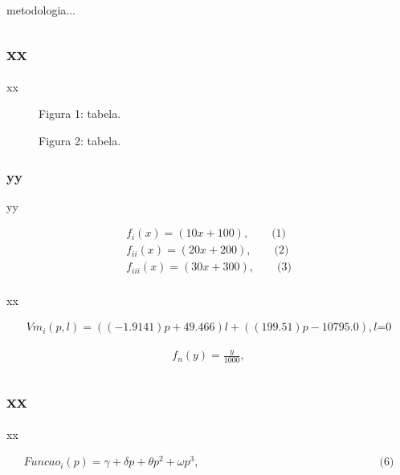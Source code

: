 \documentclass[12pt]{article}
\begin{document}
metodologia...

\subsection{xx}

xx

\newpage
\begin{figure}[H]
\centering
\begin{center}
Figura 1: tabela.
\end{center}
\end{figure}

\begin{figure}[H]
\centering
\begin{center}
Figura 2: tabela.
\end{center}
\end{figure}

\newpage
\subsubsection{yy}

yy

\begin{align*}
f_{i}(x) = (10x + 100), \qquad \text{(1)} \tag{1}\\
f_{ii}(x) = (20x + 200), \qquad \text{(2)} \tag{2} \\
f_{iii}(x) = (30x + 300), \qquad \text{(3)} \tag{3} \\
\end{align*} %

xx

\begin{align*}
Vm_{i}(p,l) = ((-1.9141)p + 49.466)l + ((199.51)p - 10795.0), \text {$l$=0} \tag{4}
\end{align*}

\begin{align*}
f_{n}(y) = \frac{y}{1000}, \tag{5}
\end{align*}

\subsection{xx}

xx

\begin{align*} 
Funcao_{i}(p) = \gamma + \delta p + \theta p^2 + \omega p^3, \qquad \qquad \qquad \qquad \qquad \qquad \qquad \qquad \text{(6)} \tag{6} \\
\end{align*} %
\end{document}
